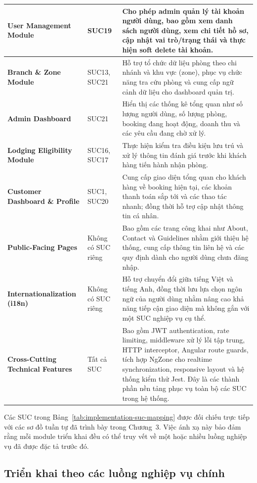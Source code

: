 \begin{longtable}{|p{4.0cm}|p{2.9cm}|p{8.1cm}|}
\hline
\textbf{User Management Module} & SUC19 & Cho phép admin quản lý tài khoản người dùng, bao gồm xem danh sách người dùng, xem chi tiết hồ sơ, cập nhật vai trò/trạng thái và thực hiện soft delete tài khoản. \\
\hline
\textbf{Branch \& Zone Module} & SUC13, SUC21 & Hỗ trợ tổ chức dữ liệu phòng theo chi nhánh và khu vực (zone), phục vụ chức năng tra cứu phòng và cung cấp ngữ cảnh dữ liệu cho dashboard quản trị. \\
\hline
\textbf{Admin Dashboard} & SUC21 & Hiển thị các thống kê tổng quan như số lượng người dùng, số lượng phòng, booking đang hoạt động, doanh thu và các yêu cầu đang chờ xử lý. \\
\hline
\textbf{Lodging Eligibility Module} & SUC16, SUC17 & Thực hiện kiểm tra điều kiện lưu trú và xử lý thông tin đánh giá trước khi khách hàng tiến hành nhận phòng. \\
\hline
\textbf{Customer Dashboard \& Profile} & SUC1, SUC20 & Cung cấp giao diện tổng quan cho khách hàng về booking hiện tại, các khoản thanh toán sắp tới và các thao tác nhanh; đồng thời hỗ trợ cập nhật thông tin cá nhân. \\
\hline
\textbf{Public-Facing Pages} & Không có SUC riêng & Bao gồm các trang công khai như About, Contact và Guidelines nhằm giới thiệu hệ thống, cung cấp thông tin liên hệ và các quy định dành cho người dùng chưa đăng nhập. \\
\hline
\textbf{Internationalization (i18n)} & Không có SUC riêng & Hỗ trợ chuyển đổi giữa tiếng Việt và tiếng Anh, đồng thời lưu lựa chọn ngôn ngữ của người dùng nhằm nâng cao khả năng tiếp cận giao diện mà không gắn với một SUC nghiệp vụ cụ thể. \\
\hline
\textbf{Cross-Cutting Technical Features} & Tất cả SUC & Bao gồm JWT authentication, rate limiting, middleware xử lý lỗi tập trung, HTTP interceptor, Angular route guards, tích hợp NgZone cho realtime synchronization, responsive layout và hệ thống kiểm thử Jest. Đây là các thành phần nền tảng phục vụ toàn bộ các SUC trong hệ thống. \\
\hline
\end{longtable}
\endgroup

Các SUC trong Bảng~\ref{tab:implementation-suc-mapping} được đối chiếu trực tiếp với các sơ đồ tuần tự đã trình bày trong Chương~3. Việc ánh xạ này bảo đảm rằng mỗi module triển khai đều có thể truy vết về một hoặc nhiều luồng nghiệp vụ đã được đặc tả trước đó.

\subsection{Triển khai theo các luồng nghiệp vụ chính}

